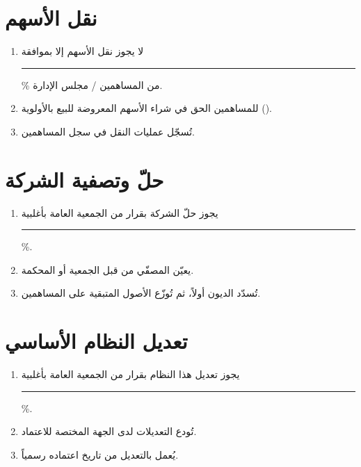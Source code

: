\documentclass[12pt,a4paper]{article}
\begin{document}
\section{نقل الأسهم}
\label{ch:transfer}

\begin{enumerate}
    \item لا يجوز نقل الأسهم إلا بموافقة \rule{2cm}{0.4pt}\% من المساهمين / مجلس الإدارة.
    \item للمساهمين الحق في شراء الأسهم المعروضة للبيع بالأولوية ().
    \item تُسجّل عمليات النقل في سجل المساهمين.
\end{enumerate}

\section{حلّ وتصفية الشركة}
\label{ch:dissolution}

\begin{enumerate}
    \item يجوز حلّ الشركة بقرار من الجمعية العامة بأغلبية \rule{2cm}{0.4pt}\%.
    \item يعيّن المصفّي من قبل الجمعية أو المحكمة.
    \item تُسدّد الديون أولاً، ثم تُوزّع الأصول المتبقية على المساهمين.
\end{enumerate}

\section{تعديل النظام الأساسي}
\label{ch:amendments}

\begin{enumerate}
    \item يجوز تعديل هذا النظام بقرار من الجمعية العامة بأغلبية \rule{2cm}{0.4pt}\%.
    \item تُودع التعديلات لدى الجهة المختصة للاعتماد.
    \item يُعمل بالتعديل من تاريخ اعتماده رسمياً.
\end{enumerate}

\vspace{2em}
\end{document}
